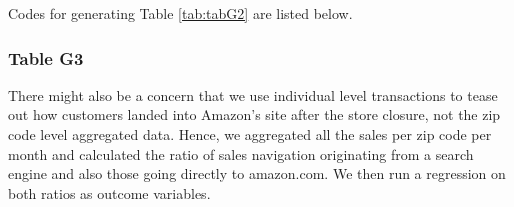 \documentclass{article}
\begin{document}
Codes for generating Table \ref{tab:tabG2} are listed below.

\pagebreak

\subsubsection{Table G3}
There might also be a concern that we use individual level transactions to tease out how customers landed into Amazon’s site after the store
closure, not the zip code level aggregated data. Hence, we aggregated all the sales per zip code per month and calculated the ratio of sales navigation originating from a search engine and also those going directly to amazon.com. We then run a regression on both ratios as outcome variables.
\end{document}
